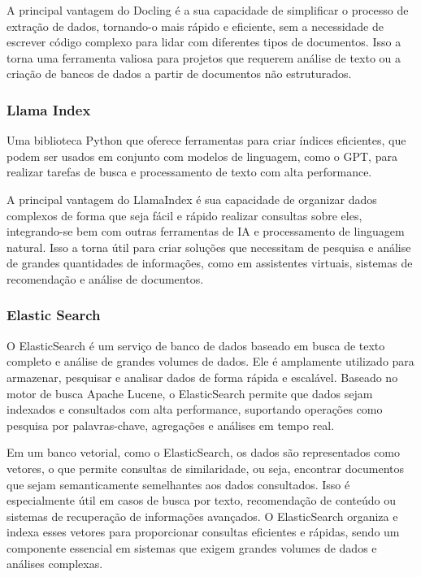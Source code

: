 \documentclass[a4paper, 12pt]{article}
\begin{document}
    A principal vantagem do Docling é a sua capacidade de simplificar o processo de extração de dados, tornando-o mais rápido e eficiente, sem a necessidade de escrever código complexo para lidar com diferentes tipos de documentos. Isso a torna uma ferramenta valiosa para projetos que requerem análise de texto ou a criação de bancos de dados a partir de documentos não estruturados.

    \subsubsection{Llama Index}
    Uma biblioteca Python que oferece ferramentas para criar índices eficientes, que podem ser usados em conjunto com modelos de linguagem, como o GPT, para realizar tarefas de busca e processamento de texto com alta performance.

    A principal vantagem do LlamaIndex é sua capacidade de organizar dados complexos de forma que seja fácil e rápido realizar consultas sobre eles, integrando-se bem com outras ferramentas de IA e processamento de linguagem natural. Isso a torna útil para criar soluções que necessitam de pesquisa e análise de grandes quantidades de informações, como em assistentes virtuais, sistemas de recomendação e análise de documentos.

    \subsubsection{Elastic Search}
    O ElasticSearch é um serviço de banco de dados baseado em busca de texto completo e análise de grandes volumes de dados. Ele é amplamente utilizado para armazenar, pesquisar e analisar dados de forma rápida e escalável. Baseado no motor de busca Apache Lucene, o ElasticSearch permite que dados sejam indexados e consultados com alta performance, suportando operações como pesquisa por palavras-chave, agregações e análises em tempo real.

    Em um banco vetorial, como o ElasticSearch, os dados são representados como vetores, o que permite consultas de similaridade, ou seja, encontrar documentos que sejam semanticamente semelhantes aos dados consultados. Isso é especialmente útil em casos de busca por texto, recomendação de conteúdo ou sistemas de recuperação de informações avançados. O ElasticSearch organiza e indexa esses vetores para proporcionar consultas eficientes e rápidas, sendo um componente essencial em sistemas que exigem grandes volumes de dados e análises complexas.
\end{document}
